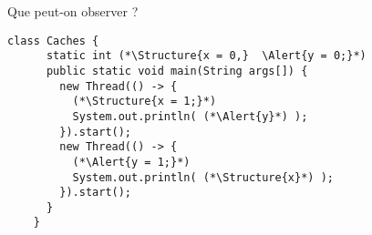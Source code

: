 
\begingroup

\begin{frame}[fragile]{Que peut-on observer ?}

  \vspace{-25mm}
  \begin{lstlisting}[gobble=4]
    class Caches {
      static int (*\Structure{x = 0,}  \Alert{y = 0;}*)
      public static void main(String args[]) {
        new Thread(() -> {
          (*\Structure{x = 1;}*)
          System.out.println( (*\Alert{y}*) );
        }).start();
        new Thread(() -> {
          (*\Alert{y = 1;}*)
          System.out.println( (*\Structure{x}*) );
        }).start();
      }
    }
  \end{lstlisting}


\end{frame}
